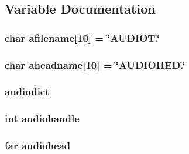\subsection{Variable Documentation}
\hypertarget{ID__CA_8C_ac7fd0efffc3b41d475ede3556547646a}{
\subsubsection[{afilename}]{\setlength{\rightskip}{0pt plus 5cm}char {\bf afilename}\mbox{[}10\mbox{]} = \char`\"{}AUDIOT.\char`\"{}}}
\label{ID__CA_8C_ac7fd0efffc3b41d475ede3556547646a}
\hypertarget{ID__CA_8C_ae27bc3abca3350509677eede2aa0f32a}{
\subsubsection[{aheadname}]{\setlength{\rightskip}{0pt plus 5cm}char {\bf aheadname}\mbox{[}10\mbox{]} = \char`\"{}AUDIOHED.\char`\"{}}}
\label{ID__CA_8C_ae27bc3abca3350509677eede2aa0f32a}
\hypertarget{ID__CA_8C_a8b8b45705a31b3dea9459d4c4aadb0d3}{
\subsubsection[{audiodict}]{ {\bf audiodict}}}
\label{ID__CA_8C_a8b8b45705a31b3dea9459d4c4aadb0d3}
\hypertarget{ID__CA_8C_a8a34d1a17f2f8ce7cf4fd38f34048890}{
\subsubsection[{audiohandle}]{\setlength{\rightskip}{0pt plus 5cm}int {\bf audiohandle}}}
\label{ID__CA_8C_a8a34d1a17f2f8ce7cf4fd38f34048890}
\hypertarget{ID__CA_8C_ab3779f97bce2b6a9ff59f713c69e7b63}{
\subsubsection[{audiohead}]{ far {\bf audiohead}}}
\label{ID__CA_8C_ab3779f97bce2b6a9ff59f713c69e7b63}
